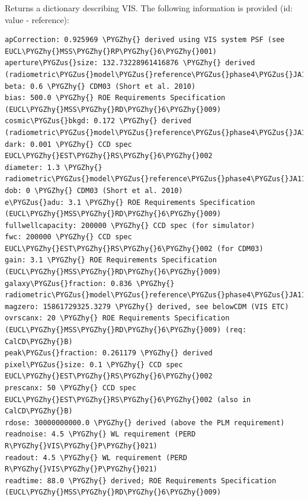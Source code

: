 \documentclass[a4paper,11pt,english]{sphinxmanual}
\def\PYGZus{\char`\_}
\def\PYGZhy{\char`\-}
\begin{document}
\begin{fulllineitems}
\label{instrument:support.VISinstrumentModel.VISinformation}
Returns a dictionary describing VIS. The following information is provided (id: value - reference):

\begin{Verbatim}[commandchars=\\\{\}]
apCorrection: 0.925969 \PYGZhy{} derived using VIS system PSF (see EUCL\PYGZhy{}MSS\PYGZhy{}RP\PYGZhy{}6\PYGZhy{}001)
aperture\PYGZus{}size: 132.73228961416876 \PYGZhy{} derived (radiometric\PYGZus{}model\PYGZus{}reference\PYGZus{}phase4\PYGZus{}JA110415\PYGZus{}2\PYGZus{}MSSL\PYGZus{}version)
beta: 0.6 \PYGZhy{} CDM03 (Short et al. 2010)
bias: 500.0 \PYGZhy{} ROE Requirements Specification (EUCL\PYGZhy{}MSS\PYGZhy{}RD\PYGZhy{}6\PYGZhy{}009)
cosmic\PYGZus{}bkgd: 0.172 \PYGZhy{} derived (radiometric\PYGZus{}model\PYGZus{}reference\PYGZus{}phase4\PYGZus{}JA110415\PYGZus{}2\PYGZus{}MSSL\PYGZus{}version)
dark: 0.001 \PYGZhy{} CCD spec EUCL\PYGZhy{}EST\PYGZhy{}RS\PYGZhy{}6\PYGZhy{}002
diameter: 1.3 \PYGZhy{} radiometric\PYGZus{}model\PYGZus{}reference\PYGZus{}phase4\PYGZus{}JA110415\PYGZus{}2\PYGZus{}MSSL\PYGZus{}version
dob: 0 \PYGZhy{} CDM03 (Short et al. 2010)
e\PYGZus{}adu: 3.1 \PYGZhy{} ROE Requirements Specification (EUCL\PYGZhy{}MSS\PYGZhy{}RD\PYGZhy{}6\PYGZhy{}009)
fullwellcapacity: 200000 \PYGZhy{} CCD spec (for simulator)
fwc: 200000 \PYGZhy{} CCD spec EUCL\PYGZhy{}EST\PYGZhy{}RS\PYGZhy{}6\PYGZhy{}002 (for CDM03)
gain: 3.1 \PYGZhy{} ROE Requirements Specification (EUCL\PYGZhy{}MSS\PYGZhy{}RD\PYGZhy{}6\PYGZhy{}009)
galaxy\PYGZus{}fraction: 0.836 \PYGZhy{} radiometric\PYGZus{}model\PYGZus{}reference\PYGZus{}phase4\PYGZus{}JA110415\PYGZus{}2\PYGZus{}MSSL\PYGZus{}version
magzero: 15861729325.3279 \PYGZhy{} derived, see belowCDM (VIS ETC)
ovrscanx: 20 \PYGZhy{} ROE Requirements Specification (EUCL\PYGZhy{}MSS\PYGZhy{}RD\PYGZhy{}6\PYGZhy{}009) (req: CalCD\PYGZhy{}B)
peak\PYGZus{}fraction: 0.261179 \PYGZhy{} derived
pixel\PYGZus{}size: 0.1 \PYGZhy{} CCD spec EUCL\PYGZhy{}EST\PYGZhy{}RS\PYGZhy{}6\PYGZhy{}002
prescanx: 50 \PYGZhy{} CCD spec EUCL\PYGZhy{}EST\PYGZhy{}RS\PYGZhy{}6\PYGZhy{}002 (also in CalCD\PYGZhy{}B)
rdose: 30000000000.0 \PYGZhy{} derived (above the PLM requirement)
readnoise: 4.5 \PYGZhy{} WL requirement (PERD R\PYGZhy{}VIS\PYGZhy{}P\PYGZhy{}021)
readout: 4.5 \PYGZhy{} WL requirement (PERD R\PYGZhy{}VIS\PYGZhy{}P\PYGZhy{}021)
readtime: 88.0 \PYGZhy{} derived; ROE Requirements Specification (EUCL\PYGZhy{}MSS\PYGZhy{}RD\PYGZhy{}6\PYGZhy{}009)

\end{Verbatim}
\end{fulllineitems}
\end{document}
